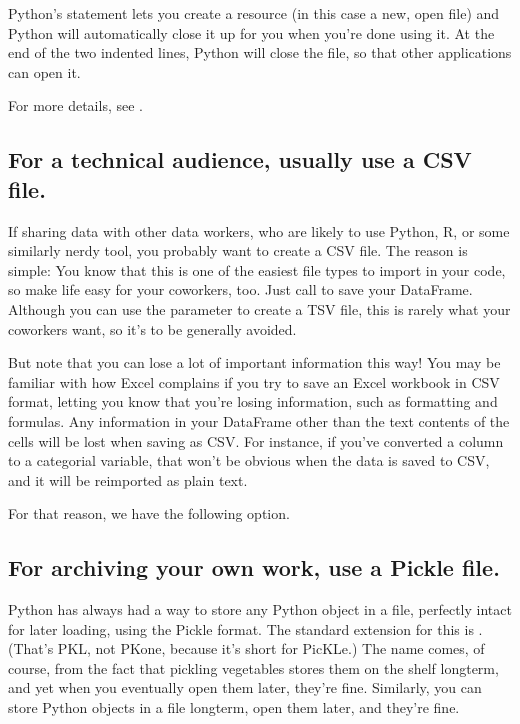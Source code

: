 \documentclass[letterpaper,10pt,english]{sphinxmanual}
\begin{document}
Python’s  statement lets you create a resource (in this case a new, open file) and Python will automatically close it up for you when you’re done using it.  At the end of the two indented lines, Python will close the file, so that other applications can open it.

For more details, see .


\subsection{For a technical audience, usually use a CSV file.}
\label{\detokenize{chapter-13-etl:for-a-technical-audience-usually-use-a-csv-file}}
If sharing data with other data workers, who are likely to use Python, R, or some similarly nerdy tool, you probably want to create a CSV file.  The reason is simple: You know that this is one of the easiest file types to import in your code, so make life easy for your coworkers, too.  Just call  to save your DataFrame.  Although you can use the  parameter to create a TSV file, this is rarely what your coworkers want, so it’s to be generally avoided.

But note that you can lose a lot of important information this way!  You may be familiar with how Excel complains if you try to save an Excel workbook in CSV format, letting you know that you’re losing information, such as formatting and formulas.  Any information in your DataFrame other than the text contents of the cells will be lost when saving as CSV.  For instance, if you’ve converted a column to a categorial variable, that won’t be obvious when the data is saved to CSV, and it will be re\sphinxhyphen{}imported as plain text.

For that reason, we have the following option.


\subsection{For archiving your own work, use a Pickle file.}
\label{\detokenize{chapter-13-etl:for-archiving-your-own-work-use-a-pickle-file}}
Python has always had a way to store any Python object in a file, perfectly intact for later loading, using the Pickle format.  The standard extension for this is .  (That’s P\sphinxhyphen{}K\sphinxhyphen{}L, not P\sphinxhyphen{}K\sphinxhyphen{}one, because it’s short for PicKLe.)  The name comes, of course, from the fact that pickling vegetables stores them on the shelf long\sphinxhyphen{}term, and yet when you eventually open them later, they’re fine.  Similarly, you can store Python objects in a file long\sphinxhyphen{}term, open them later, and they’re fine.
\end{document}
